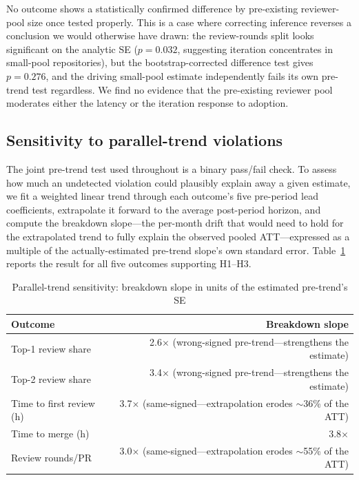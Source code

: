 \documentclass[12pt]{article}
\begin{document}
No outcome shows a statistically confirmed difference by pre-existing
reviewer-pool size once tested properly. This is a case where correcting
inference reverses a conclusion we would otherwise have drawn: the
review-rounds split looks significant on the analytic SE ($p=0.032$,
suggesting iteration concentrates in small-pool repositories), but the
bootstrap-corrected difference test gives $p=0.276$, and the driving
small-pool estimate independently fails its own pre-trend test regardless.
We find no evidence that the pre-existing reviewer pool moderates either
the latency or the iteration response to adoption.

\subsection{Sensitivity to parallel-trend violations}
\label{sec:trend-sensitivity}

The joint pre-trend test used throughout is a binary pass/fail check.
To assess how much an undetected violation could plausibly explain
away a given estimate, we fit a weighted linear trend through each
outcome's five pre-period lead coefficients, extrapolate it forward to
the average post-period horizon, and compute the breakdown
slope---the per-month drift that would need to hold for the extrapolated
trend to fully explain the observed pooled ATT---expressed as a multiple
of the actually-estimated pre-trend slope's own standard error.
Table~\ref{tab:breakdown} reports the result for all five outcomes
supporting H1--H3.

\begin{table}[htbp]
\centering
\caption{Parallel-trend sensitivity: breakdown slope in units of the estimated pre-trend's SE}
\label{tab:breakdown}
\small
\begin{tabular}{lr}
\toprule
Outcome & Breakdown slope \\
\midrule
Top-1 review share       & 2.6$\times$ (wrong-signed pre-trend---strengthens the estimate) \\
Top-2 review share       & 3.4$\times$ (wrong-signed pre-trend---strengthens the estimate) \\
Time to first review (h) & 3.7$\times$ (same-signed---extrapolation erodes $\sim$36\% of the ATT) \\
Time to merge (h)        & 3.8$\times$ \\
Review rounds/PR         & 3.0$\times$ (same-signed---extrapolation erodes $\sim$55\% of the ATT) \\
\bottomrule
\end{tabular}
\end{table}
\end{document}
